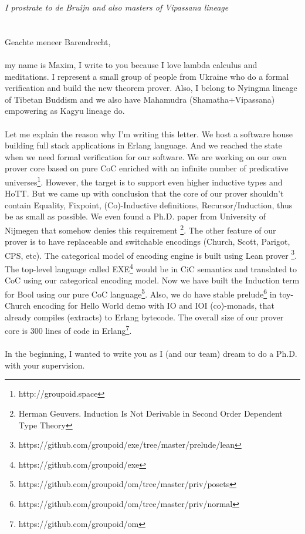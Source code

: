 \documentclass[10pt]{article}
\begin{document}
 {\it \null\hfill\small I prostrate to de Bruijn and also masters of Vipassana lineage}\\
 \\
 \\
Geachte meneer Barendrecht,\\
\\
\indent my name is Maxim, I write to you because I love lambda calculus and meditations.
I represent a small group of people from Ukraine who do a formal verification and build the new theorem prover.
Also, I belong to Nyingma lineage of Tibetan Buddism
and we also have Mahamudra (Shamatha+Vipassana) empowering as Kagyu lineage do.\\
\\
Let me explain the reason why I'm writing this letter.
We host a software house building full stack applications in Erlang language.
And we reached the state when we need formal verification for our software.
We are working on our own prover core based on pure CoC enriched with an infinite number of predicative universes\footnote{http://groupoid.space}.
However, the target is to support even higher inductive types and HoTT.
But we came up with conclusion that the core of our prover shouldn't
contain Equality, Fixpoint, (Co)-Inductive definitions, Recursor/Induction, thus be as small as possible.
We even found a Ph.D. paper from University of Nijmegen that somehow denies this requirement \footnote{Herman Geuvers. Induction Is Not Derivable in Second Order Dependent Type Theory}.
The other feature of our prover is to have replaceable and switchable encodings (Church, Scott, Parigot, CPS, etc).
The categorical model of encoding engine is built using Lean prover \footnote{https://github.com/groupoid/exe/tree/master/prelude/lean}.
The top-level language called EXE\footnote{https://github.com/groupoid/exe} would be in CiC semantics and translated to CoC using our categorical encoding model.
Now we have built the Induction term for Bool using our pure CoC language\footnote{https://github.com/groupoid/om/tree/master/priv/posets}.
Also, we do have stable prelude\footnote{https://github.com/groupoid/om/tree/master/priv/normal} in toy-Church encoding for Hello World demo with IO and IOI (co)-monads,
that already compiles (extracts) to Erlang bytecode.
The overall size of our prover core is 300 lines of code in Erlang\footnote{https://github.com/groupoid/om}.\\
\\
In the beginning, I wanted to write you as I (and our team) dream to do a Ph.D. with your supervision.
\end{document}

